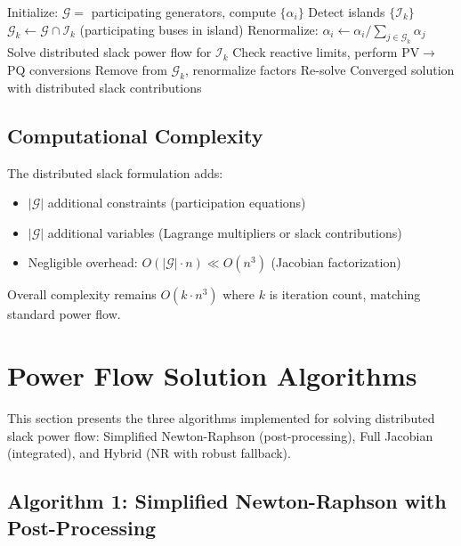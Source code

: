 \documentclass[11pt]{article}
\begin{document}
\begin{algorithm}
\caption{Adaptive Power Flow with Distributed Slack}
\begin{algorithmic}[1]
\STATE Initialize: $\mathcal{G} =$ participating generators, compute $\{\alpha_i\}$
\STATE Detect islands $\{\mathcal{I}_k\}$
    \STATE $\mathcal{G}_k \gets \mathcal{G} \cap \mathcal{I}_k$ (participating buses in island)
    \STATE Renormalize: $\alpha_i \gets \alpha_i / \sum_{j \in \mathcal{G}_k} \alpha_j$
    \STATE Solve distributed slack power flow for $\mathcal{I}_k$
    \STATE Check reactive limits, perform PV$\to$PQ conversions
        \STATE Remove from $\mathcal{G}_k$, renormalize factors
        \STATE Re-solve
    \ENDIF
\ENDFOR
\RETURN Converged solution with distributed slack contributions
\end{algorithmic}
\end{algorithm}

\subsection{Computational Complexity}

The distributed slack formulation adds:
\begin{itemize}
    \item $|\mathcal{G}|$ additional constraints (participation equations)
    \item $|\mathcal{G}|$ additional variables (Lagrange multipliers or slack contributions)
    \item Negligible overhead: $O(|\mathcal{G}| \cdot n) \ll O(n^3)$ (Jacobian factorization)
\end{itemize}

Overall complexity remains $O(k \cdot n^3)$ where $k$ is iteration count, matching standard power flow.

\section{Power Flow Solution Algorithms}

This section presents the three algorithms implemented for solving distributed slack power flow: Simplified Newton-Raphson (post-processing), Full Jacobian (integrated), and Hybrid (NR with robust fallback).

\subsection{Algorithm 1: Simplified Newton-Raphson with Post-Processing}
\end{document}
